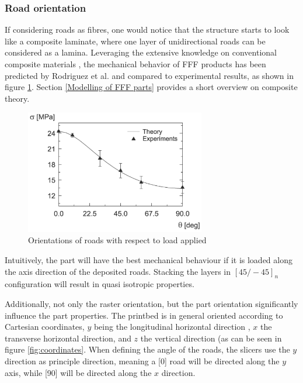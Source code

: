 \subsubsection{Road orientation}
If considering roads as fibres, one would notice that the structure starts to look like a composite laminate, where one layer of unidirectional roads can be considered as a lamina. Leveraging the extensive knowledge on conventional composite materials \cite{Daniel2006EngineeringMaterials}, the mechanical behavior of FFF products has been predicted by Rodriguez et al. \cite{Rodriguez2003MechanicalModeling} and compared to experimental results, as shown in figure \ref{fig:Orientation}. Section \ref{Modelling of FFF parts} provides a short overview on composite theory.

\begin{figure}[htb]
    \centering
    \includegraphics[width=0.7\textwidth]{chapter_2/figures/Orientation.PNG}
    \caption{Orientations of roads with respect to load applied \cite{Rodriguez2003MechanicalModeling}}
    \label{fig:Orientation}
\end{figure}

Intuitively, the part will have the best mechanical behaviour if it is loaded along the axis direction of the deposited roads. Stacking the layers in  $[45/-45]_n$ configuration will result in quasi isotropic properties.

Additionally, not only the raster orientation, but the part orientation significantly influence the part properties. The printbed is in general oriented according to Cartesian coordinates, $y$  being the longitudinal horizontal direction , $x$ the transverse horizontal direction, and $z$ the vertical direction (as can be seen in figure \ref{fig:coordinates}. When defining the angle of the roads, the slicers use the $y$ direction as principle direction, meaning a [0] road will be directed along the $y$ axis, while [90] will be directed along the $x$ direction. 

